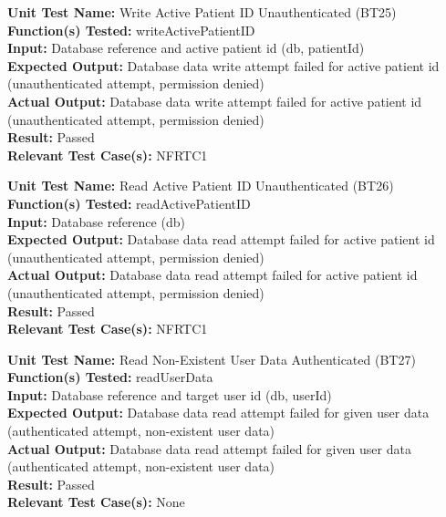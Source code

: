 \documentclass[12pt, titlepage]{article}
\begin{document}
\begin{mdframed}[linewidth=0.5mm]
  \textbf{Unit Test Name:} Write Active Patient ID Unauthenticated (BT25) \\
  \textbf{Function(s) Tested:} writeActivePatientID \\
  \textbf{Input:} Database reference and active patient id (db, patientId) \\
  \textbf{Expected Output:} Database data write attempt failed for active patient id (unauthenticated attempt, permission denied) \\
  \textbf{Actual Output:} Database data write attempt failed for active patient id (unauthenticated attempt, permission denied) \\
  \textbf{Result:} Passed \\
  \textbf{Relevant Test Case(s):} NFRTC1
\end{mdframed}

\begin{mdframed}[linewidth=0.5mm]
  \textbf{Unit Test Name:} Read Active Patient ID Unauthenticated (BT26) \\
  \textbf{Function(s) Tested:} readActivePatientID \\
  \textbf{Input:} Database reference (db) \\
  \textbf{Expected Output:} Database data read attempt failed for active patient id (unauthenticated attempt, permission denied) \\
  \textbf{Actual Output:} Database data read attempt failed for active patient id (unauthenticated attempt, permission denied) \\
  \textbf{Result:} Passed \\
  \textbf{Relevant Test Case(s):} NFRTC1
\end{mdframed}

\begin{mdframed}[linewidth=0.5mm]
  \textbf{Unit Test Name:} Read Non-Existent User Data Authenticated (BT27) \\
  \textbf{Function(s) Tested:} readUserData \\
  \textbf{Input:} Database reference and target user id (db, userId) \\
  \textbf{Expected Output:} Database data read attempt failed for given user data (authenticated attempt, non-existent user data) \\
  \textbf{Actual Output:} Database data read attempt failed for given user data (authenticated attempt, non-existent user data) \\
  \textbf{Result:} Passed \\
  \textbf{Relevant Test Case(s):} None
\end{mdframed}
\end{document}

